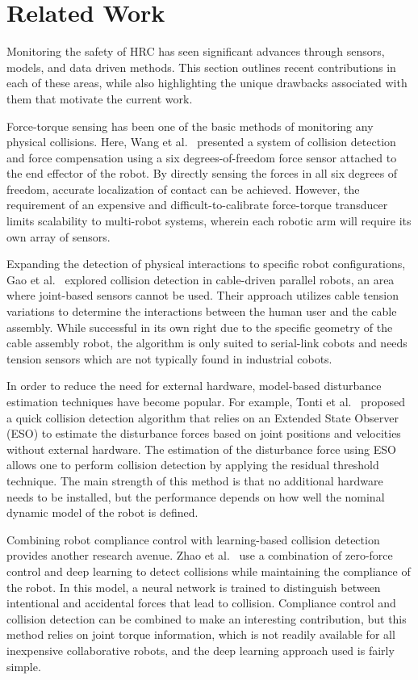 \documentclass[pdflatex,sn-basic]{sn-jnl}%
\begin{document}
\section{Related Work}\label{sec:related}

Monitoring the safety of HRC has seen significant advances through sensors, models, and data driven methods. This section outlines recent contributions in each of these areas, while also highlighting the unique drawbacks associated with them that motivate the current work.

Force-torque sensing has been one of the basic methods of monitoring any physical collisions. Here, Wang et al.~\cite{wang2025sixdof} presented a system of collision detection and force compensation using a six degrees-of-freedom force sensor attached to the end effector of the robot. By directly sensing the forces in all six degrees of freedom, accurate localization of contact can be achieved. However, the requirement of an expensive and difficult-to-calibrate force-torque transducer limits scalability to multi-robot systems, wherein each robotic arm will require its own array of sensors.

Expanding the detection of physical interactions to specific robot configurations, Gao et al.~\cite{gao2024cable} explored collision detection in cable-driven parallel robots, an area where joint-based sensors cannot be used. Their approach utilizes cable tension variations to determine the interactions between the human user and the cable assembly. While successful in its own right due to the specific geometry of the cable assembly robot, the algorithm is only suited to serial-link cobots and needs tension sensors which are not typically found in industrial cobots.

In order to reduce the need for external hardware, model-based disturbance estimation techniques have become popular. For example, Tonti et al.~\cite{tonti2024eso} proposed a quick collision detection algorithm that relies on an Extended State Observer (ESO) to estimate the disturbance forces based on joint positions and velocities without external hardware. The estimation of the disturbance force using ESO allows one to perform collision detection by applying the residual threshold technique. The main strength of this method is that no additional hardware needs to be installed, but the performance depends on how well the nominal dynamic model of the robot is defined.

Combining robot compliance control with learning-based collision detection provides another research avenue. Zhao et al.~\cite{zhao2025zeroforce} use a combination of zero-force control and deep learning to detect collisions while maintaining the compliance of the robot. In this model, a neural network is trained to distinguish between intentional and accidental forces that lead to collision. Compliance control and collision detection can be combined to make an interesting contribution, but this method relies on joint torque information, which is not readily available for all inexpensive collaborative robots, and the deep learning approach used is fairly simple.
\end{document}
